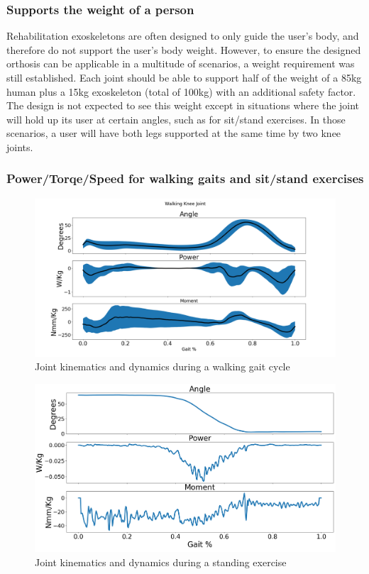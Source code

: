 \subsubsection{Supports the weight of a person}
 Rehabilitation exoskeletons are often designed to only guide the user's body, and therefore do not support the user's body weight. However, to ensure the designed orthosis can be applicable in a multitude of scenarios, a weight requirement was still established. Each joint should be able to support half of the weight of a 85kg human plus a 15kg exoskeleton (total of 100kg) with an additional safety factor. The design is not expected to see this weight except in situations where the joint will hold up its user at certain angles, such as for sit/stand exercises. In those scenarios, a user will have both legs supported at the same time by two knee joints.

\subsubsection{Power/Torqe/Speed for walking gaits and sit/stand exercises}

\begin{figure}[ht!]
    \centering
    \includegraphics[width=\linewidth]{Figures/Design/WalkingPowerCurveKnee.png}
    \caption{Joint kinematics and dynamics during a walking gait cycle \cite{SpringWrapClutchKnee}}
    \label{fig:WalkingPowerCurve}
\end{figure}

\begin{figure}[ht!]
    \centering
    \includegraphics[width=\linewidth]{Figures/Design/SitStandPowerCurveKnee.png}
    \caption{Joint kinematics and dynamics during a standing exercise \cite{SpringWrapClutchKnee}}
    \label{fig:SitStandPowerCurve}
\end{figure}

